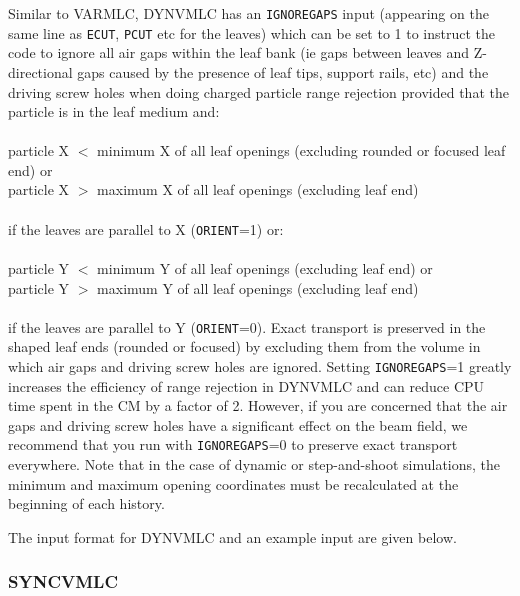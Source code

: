 \documentclass[12pt,twoside]{article}
\begin{document}
Similar to VARMLC, DYNVMLC has an {\tt IGNOREGAPS} input
(appearing on
the same line as {\tt ECUT}, {\tt PCUT} etc for the leaves)
which can be set to 1 to instruct the code to ignore all air gaps
within the leaf bank (ie gaps between leaves and Z-directional gaps caused
by the presence of leaf tips, support rails, etc) and the driving screw
holes when doing charged particle range rejection provided that the particle
is in the leaf medium and:\\
~~~\\
particle X $<$ minimum X of all leaf openings (excluding rounded or focused leaf
 end) or\\
particle X $>$ maximum X of all leaf openings (excluding leaf end)\\
~~\\
if the leaves are parallel to X ({\tt ORIENT}=1) or:\\
~~~\\
particle Y $<$ minimum Y of all leaf openings (excluding leaf end) or\\
particle Y $>$ maximum Y of all leaf openings (excluding leaf end)\\
~~\\
if the leaves are parallel to Y ({\tt ORIENT}=0).  Exact transport is
preserved in the shaped leaf ends (rounded or focused) by excluding them
from the volume in which air gaps and driving screw holes are ignored.
Setting {\tt IGNOREGAPS}=1 greatly increases the efficiency of range rejection
in DYNVMLC and can reduce CPU time spent in the CM by a factor of 2.
However, if you are concerned that the air gaps and driving screw holes
have a significant effect on the beam field, we recommend that you
run with {\tt IGNOREGAPS}=0 to preserve exact transport everywhere.  Note that
in the case of dynamic or step-and-shoot simulations, the minimum and
maximum opening coordinates must be recalculated at the beginning of
each history.

The input format for DYNVMLC and an example input are given below.
\begin{small}

\end{small}


\clearpage
\renewcommand{\rightmark}{SYNCVMLC CM}
\subsubsection{SYNCVMLC}
\label{syncvmlcsect}
\end{document}
